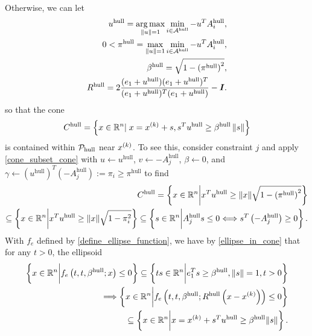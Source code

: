 Otherwise, we can let
\begin{align*}
u^{\textrm{hull}} = \operatorname*{arg\,max}_{\|u\| = 1} \min_{i \in \mathcal A^{\textrm{hull}}} -u^TA_i^{\textrm{hull}}, \\
0 < \pi^{\textrm{hull}} = \max_{\|u\| = 1} \min_{i \in \mathcal A^{\textrm{hull}}} -u^TA_i^{\textrm{hull}}, \\
\beta^{\textrm{hull}} = \sqrt{1 - \left(\pi^{\textrm{hull}}\right)^2}, \\
R^{\textrm{hull}} = 2\frac{(e_1 + u^{\textrm{hull}})(e_1 + u^{\textrm{hull}})^T}{(e_1 + u^{\textrm{hull}})^T(e_1 + u^{\textrm{hull}})} - \boldsymbol I.
\end{align*}
so that the cone
\begin{align*}
C^{\textrm{hull}} = \left\{x \in \mathbb R^n | \; x = x^{(k)} + s, s^Tu^{\textrm{hull}} \ge \beta^{\textrm{hull}} \left\|s\right\| \right\}
\end{align*}
is contained within $\mathcal P_{\textrm{hull}}$ near $x^{(k)}$.
To see this, consider constraint $j$ and apply \cref{cone_subset_cone} with
$u \gets u^{\textrm{hull}}$, 
$v \gets -A_j^{\textrm{hull}}$, 
$\beta \gets 0$, 
and $\gamma \gets \left(u^{\textrm{hull}} \right)^T \left( -A_j^{\textrm{hull}}\right) := \pi_i \ge \pi^{\textrm{hull}}$
to find
\begin{align*}
C^{\textrm{hull}} = \left\{x \in \mathbb R^n \bigg | x^T u^\textrm{hull} \ge \|x\| \sqrt{1 - \left(\pi^{\textrm{hull}}\right)^2} \right\} \\
\subseteq \left\{x \in \mathbb R^n \bigg | x^T u^\textrm{hull} \ge \|x\| \sqrt{1 - \pi_i^2} \right\} 
\subseteq \left\{s \in \mathbb R^n \bigg| A_j^{\textrm{hull}} s \le 0 \Longleftrightarrow s^T\left(-A_j^{\textrm{hull}}\right) \ge 0 \right\}.
\end{align*}
With $f_e$ defined by \cref{define_ellipse_function}, we have by \cref{ellipse_in_cone} that
for any $t > 0$, the ellipsoid
\begin{align*}
\left\{x \in \mathbb R^n \bigg | f_e\left(t, t,  \beta^{\textrm{hull}}; x \right) \le 0\right\} \subseteq \left\{ts \in \mathbb R^n \bigg | e_1^T s \ge \beta^{\textrm{hull}}, \|s\| = 1, t > 0\right\} \\
\Longrightarrow \left\{x \in \mathbb R^n \bigg | f_e\left(t, t,  \beta^{\textrm{hull}};  R^{\textrm{hull}}\left(x - x^{(k)}\right) \right) \le 0\right\} \\
\subseteq \left\{x \in \mathbb R^n \bigg | x = x^{(k)} + s^Tu^{\textrm{hull}} \ge \beta^{\textrm{hull}}\|s\| \right\}.
\end{align*}

